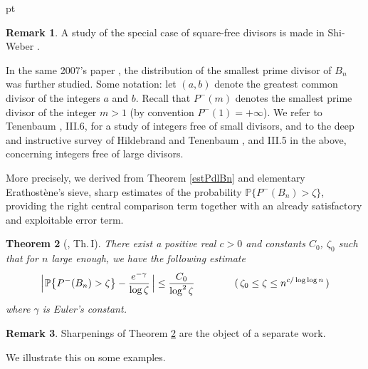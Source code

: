 \documentclass[11pt,draft,reqno]{amsart}
\newtheorem{theorem}{Theorem}[section]
\newtheorem{corollary}[theorem]{Corollary}
\theoremstyle{definition}
\theoremstyle{remarks}
\newtheorem{remark}[theorem]{{\bf  Remark}}
\numberwithin{equation}{section}
\def \g{{\gamma}}
\def \m{{\mu}}
\def \qq{{\qquad}}
\def\P{{\mathcal P}}
\def\P{{\mathbb P}}
\begin{document}
 pt
\begin{remark}\rm
A study of the special case   of square-free divisors  is made in Shi-Weber \cite{Sh.We1}.
 \end{remark} 

\medskip \par
  In the same 2007's paper \cite{W1}, the distribution of the smallest prime divisor of $B_n$ was further studied.  Some notation: let $(a,b)$ denote the greatest common divisor of the integers $a$ and $b$. Recall that    $P^-(m )$ denotes    the smallest
prime divisor  of the integer $m>1$ (by convention $P^-(1)=+\infty$). We refer to   Tenenbaum \cite{Te}, III.6, for a study of integers free of   small divisors, and to the deep and instructive survey of Hildebrand and Tenenbaum \cite{HT}, and III.5 in the above, concerning    integers free of large divisors. 

More precisely, we    derived   from Theorem \ref{estPdlBn}  and elementary Erathost\`ene's sieve,   sharp estimates of  the probability $\P \{ P^-( B_n ) > \zeta  \}$,  
providing   the right central comparison term  together with an already   satisfactory and exploitable error term. %
  \begin{theorem}[\cite{W1}, Th.\,I]\label{P-Bn}
  There exist a positive real $c>0$ and   constants $C_0$, $\zeta_0$ such that for $n$ large
enough,   we have the
 following estimate
$$
\Big|\hskip1pt\P\big\{ P^-( B_n ) > \zeta \big\}-     { e^{-\gamma} \over  \log
\zeta }\,\Big|  \le  { C_0 \over   \log^2 \zeta } \qq \qquad (\,\zeta_0\le  \zeta\le n^{c/\log\log n}\,) $$
 where    $\g$ is  Euler's constant.
\end{theorem}
\begin{remark}\rm Sharpenings of Theorem \ref{P-Bn} are the object of a separate work.
\end{remark} 
We illustrate this on
some examples.
 
 
 
\end{document}
